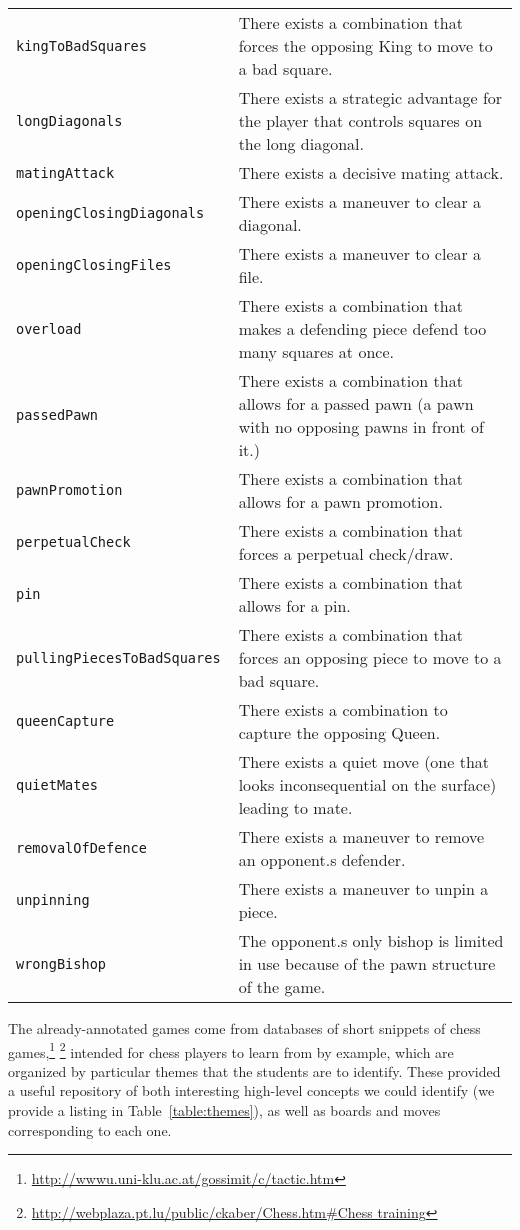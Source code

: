 \documentclass[11pt]{article}
\begin{document}
\begin{table*}[p]
\begin{tabular}{lp{}}
\tt{kingToBadSquares} & There exists a combination that forces the 
opposing King to move to a bad square. \\
\tt{longDiagonals} & There exists a strategic advantage for the player 
that controls squares on the long diagonal. \\
\tt{matingAttack} & There exists a decisive mating attack. \\
\tt{openingClosingDiagonals} & There exists a maneuver to clear a 
diagonal. \\
\tt{openingClosingFiles} & There exists a maneuver to clear a file. \\
\tt{overload} & There exists a combination that makes a defending piece 
defend too many squares at once. \\
\tt{passedPawn} & There exists a combination that allows for a passed 
pawn (a pawn with no opposing pawns in front of it.) \\
\tt{pawnPromotion} & There exists a combination that allows for a pawn 
promotion. \\
\tt{perpetualCheck} & There exists a combination that forces a perpetual 
check/draw. \\
\tt{pin} & There exists a combination that allows for a pin. \\
\tt{pullingPiecesToBadSquares} & There exists a combination that forces 
an opposing piece to move to a bad square. \\
\tt{queenCapture} & There exists a combination to capture the opposing 
Queen. \\
\tt{quietMates} & There exists a quiet move (one that looks 
inconsequential on the surface) leading to mate. \\
\tt{removalOfDefence} & There exists a maneuver to remove an opponent.s 
defender. \\
\tt{unpinning} & There exists a maneuver to unpin a piece. \\
\tt{wrongBishop} & The opponent.s only bishop is limited in use because 
of the pawn structure of the game. \\ \hline
\end{tabular}
\caption{List of high-level themes we attempt to automatically identify, 
along with explanations}
\label{table:themes}
\end{table*}

The already-annotated games come from databases of short snippets of 
chess 
games,\footnote{\url{http://wwwu.uni-klu.ac.at/gossimit/c/tactic.htm}} 
\footnote{\url{http://webplaza.pt.lu/public/ckaber/Chess.htm#Chess 
training}} intended for chess players to learn from by example, which 
are organized by particular themes that the students are to identify. 
These provided a useful repository of both interesting high-level 
concepts we could identify (we provide a listing in 
Table~\ref{table:themes}), as well as boards and moves corresponding to 
each one.
\end{document}
